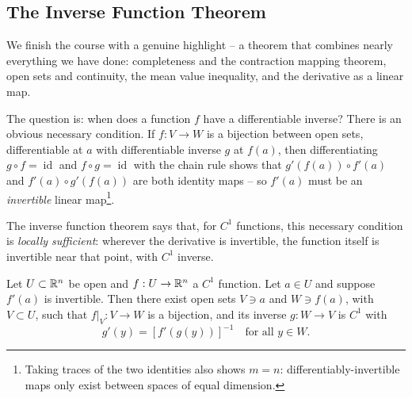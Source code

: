 \documentclass[a4paper]{scrartcl}
\begin{document}
\subsection{The Inverse Function Theorem}

We finish the course with a genuine highlight -- a theorem that combines nearly everything we have done: completeness and the contraction mapping theorem, open sets and continuity, the mean value inequality, and the derivative as a linear map.

The question is: when does a function $f$ have a differentiable inverse? There is an obvious necessary condition. If $f: V \rightarrow W$ is a bijection between open sets, differentiable at $a$ with differentiable inverse $g$ at $f(a)$, then differentiating $g \circ f = \operatorname{id}$ and $f \circ g = \operatorname{id}$ with the chain rule shows that $g'(f(a)) \circ f'(a)$ and $f'(a) \circ g'(f(a))$ are both identity maps -- so $f'(a)$ must be an \emph{invertible} linear map\footnote{Taking traces of the two identities also shows $m = n$: differentiably-invertible maps only exist between spaces of equal dimension.}.

The inverse function theorem says that, for $C^1$ functions, this necessary condition is \emph{locally sufficient}: wherever the derivative is invertible, the function itself is invertible near that point, with $C^1$ inverse.

\begin{theorem}
    Let $U \subset \mathbb{R}^n$ be open and $f: U \rightarrow \mathbb{R}^n$ a $C^1$ function. Let $a \in U$ and suppose $f'(a)$ is invertible. Then there exist open sets $V \ni a$ and $W \ni f(a)$, with $V \subset U$, such that $f|_V: V \rightarrow W$ is a bijection, and its inverse $g: W \rightarrow V$ is $C^1$ with
    $$
    g'(y) = \left[f'(g(y))\right]^{-1} \quad \text{for all } y \in W.
    $$
\end{theorem}

\begin{center}
\end{center}
\end{document}
